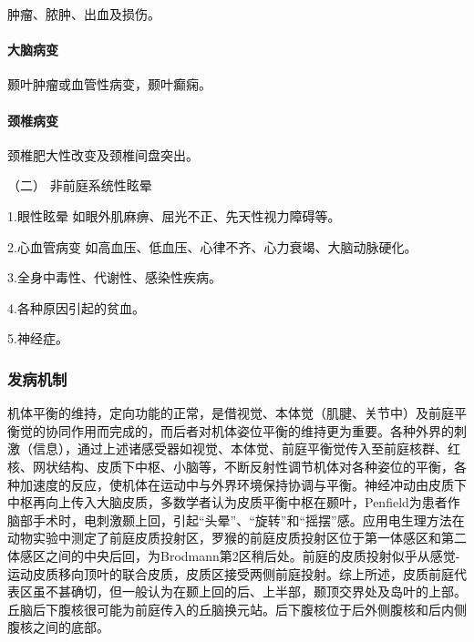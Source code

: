 肿瘤、脓肿、出血及损伤。

\paragraph{大脑病变}

颞叶肿瘤或血管性病变，颞叶癫痫。

\paragraph{颈椎病变}

颈椎肥大性改变及颈椎间盘突出。

\hypertarget{text00012.htmlux5cux23CHP1-3-1-1-2}{}
（二） 非前庭系统性眩晕

1.眼性眩晕 如眼外肌麻痹、屈光不正、先天性视力障碍等。

2.心血管病变 如高血压、低血压、心律不齐、心力衰竭、大脑动脉硬化。

3.全身中毒性、代谢性、感染性疾病。

4.各种原因引起的贫血。

5.神经症。

\subsubsection{发病机制}

机体平衡的维持，定向功能的正常，是借视觉、本体觉（肌腱、关节中）及前庭平衡觉的协同作用而完成的，而后者对机体姿位平衡的维持更为重要。各种外界的刺激（信息），通过上述诸感受器如视觉、本体觉、前庭平衡觉传入至前庭核群、红核、网状结构、皮质下中枢、小脑等，不断反射性调节机体对各种姿位的平衡，各种加速度的反应，使机体在运动中与外界环境保持协调与平衡。神经冲动由皮质下中枢再向上传入大脑皮质，多数学者认为皮质平衡中枢在颞叶，Penfield为患者作脑部手术时，电刺激颞上回，引起“头晕”、“旋转”和“摇摆”感。应用电生理方法在动物实验中测定了前庭皮质投射区，罗猴的前庭皮质投射区位于第一体感区和第二体感区之间的中央后回，为Brodmann第2区稍后处。前庭的皮质投射似乎从感觉-运动皮质移向顶叶的联合皮质，皮质区接受两侧前庭投射。综上所述，皮质前庭代表区虽不甚确切，但一般认为在颞上回的后、上半部，颞顶交界处及岛叶的上部。丘脑后下腹核很可能为前庭传入的丘脑换元站。后下腹核位于后外侧腹核和后内侧腹核之间的底部。

